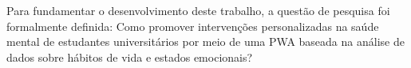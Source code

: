 
  
  Para fundamentar o desenvolvimento deste trabalho, a questão de pesquisa foi formalmente definida: Como promover intervenções personalizadas na saúde mental de estudantes universitários por meio de uma PWA baseada na análise de dados sobre hábitos de vida e estados emocionais?

